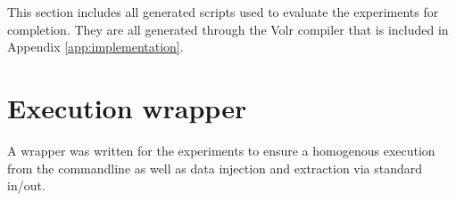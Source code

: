 
This section includes all generated scripts used to evaluate the experiments for
completion. 
They are all generated through the Volr compiler that is included in Appendix
\ref{app:implementation}.

\section{Execution wrapper}

A wrapper was written for the experiments to ensure a homogenous execution from
the commandline as well as data injection and extraction via standard in/out.



